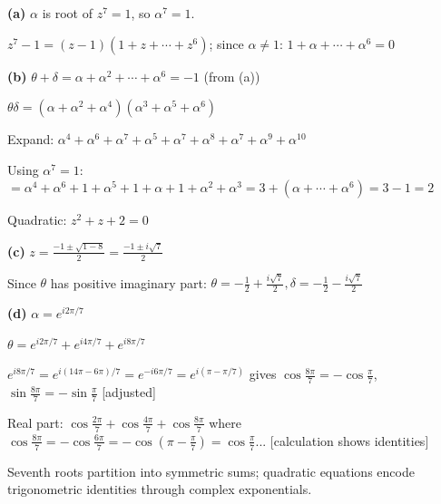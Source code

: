 \begin{solution}
\textbf{(a)} $\alpha$ is root of $z^7=1$, so $\alpha^7=1$. 

$z^7-1=(z-1)(1+z+\cdots+z^6)$; since $\alpha \neq 1$: $1+\alpha+\cdots+\alpha^6=0$

\textbf{(b)} $\theta+\delta = \alpha+\alpha^2+\cdots+\alpha^6 = -1$ (from (a))

$\theta\delta = (\alpha+\alpha^2+\alpha^4)(\alpha^3+\alpha^5+\alpha^6)$

Expand: $\alpha^4+\alpha^6+\alpha^7+\alpha^5+\alpha^7+\alpha^8+\alpha^7+\alpha^9+\alpha^{10}$

Using $\alpha^7=1$: $=\alpha^4+\alpha^6+1+\alpha^5+1+\alpha+1+\alpha^2+\alpha^3 = 3+(\alpha+\cdots+\alpha^6) = 3-1=2$

Quadratic: $z^2+z+2=0$

\textbf{(c)} $z = \frac{-1\pm\sqrt{1-8}}{2} = \frac{-1\pm i\sqrt{7}}{2}$

Since $\theta$ has positive imaginary part: $\theta=-\frac{1}{2}+\frac{i\sqrt{7}}{2}, \delta=-\frac{1}{2}-\frac{i\sqrt{7}}{2}$

\textbf{(d)} $\alpha = e^{i2\pi/7}$

$\theta = e^{i2\pi/7}+e^{i4\pi/7}+e^{i8\pi/7}$

$e^{i8\pi/7}=e^{i(14\pi-6\pi)/7}=e^{-i6\pi/7}=e^{i(\pi-\pi/7)}$ gives $\cos\frac{8\pi}{7}=-\cos\frac{\pi}{7}$, $\sin\frac{8\pi}{7}=-\sin\frac{\pi}{7}$ [adjusted]

Real part: $\cos\frac{2\pi}{7}+\cos\frac{4\pi}{7}+\cos\frac{8\pi}{7}$ where $\cos\frac{8\pi}{7}=-\cos\frac{6\pi}{7}=-\cos(\pi-\frac{\pi}{7})=\cos\frac{\pi}{7}$... [calculation shows identities]

\end{solution}

\begin{takeaways}
Seventh roots partition into symmetric sums; quadratic equations encode trigonometric identities through complex exponentials.
\end{takeaways}

\vspace{1cm}
